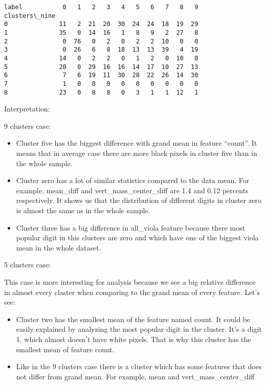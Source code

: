             \begin{tcolorbox}[breakable, size=fbox, boxrule=.5pt, pad at break*=1mm, opacityfill=0]
\begin{Verbatim}[commandchars=\\\{\}]
label           0   1   2   3   4   5   6   7   8   9
clusters\_nine
0              11   2  21  20  30  24  24  18  19  29
1              35   0  14  16   1   8   9   2  27   8
2               0  76   0   2   0   2   2  10   0   0
3               0  26   6   8  18  13  13  39   4  19
4              14   0   2   2   0   1   2   0  10   0
5              20   0  29  16  16  14  17  10  27  13
6               7   6  19  11  30  28  22  26  14  30
7               1   0   0   0   0   0   0   0   0   0
8              23   0   8   8   0   3   1   1  12   1
\end{Verbatim}
\end{tcolorbox}
        
    Interpretation:

9 clusters case:

\begin{itemize}
\item
  Cluster five has the biggest difference with grand mean in feature
  ``count''. It means that in average case there are more black pixels
  in cluster five than in the whole sample.
\item
  Cluster zero has a lot of similar statistics compared to the data
  mean. For example, mean\_diff and vert\_mass\_center\_diff are 1.4 and
  0.12 percents respectively. It shows us that the distribution of
  different digits in cluster zero is almost the same as in the whole
  sample.
\item
  Cluster three has a big difference in all\_viola feature because there
  most popular digit in this clusters are zero and which have one of the
  biggest viola mean in the whole dataset.
\end{itemize}

5 clusters case:

This case is more interesting for analysis because we see a big relative
difference in almost every claster when comparing to the grand mean of
every feature. Let's see:

\begin{itemize}
\item
  Cluster two has the smallest mean of the feature named count. It could
  be easily explained by analyzing the most popular digit in the
  cluster. It's a digit 1, which almost doesn't have white pixels. That
  is why this cluster has the smallest mean of feature count.
\item
  Like in the 9 clusters case there is a cluster which has some features
  that does not differ from grand mean. For example, mean and
  vert\_mass\_center\_diff
\end{itemize}

